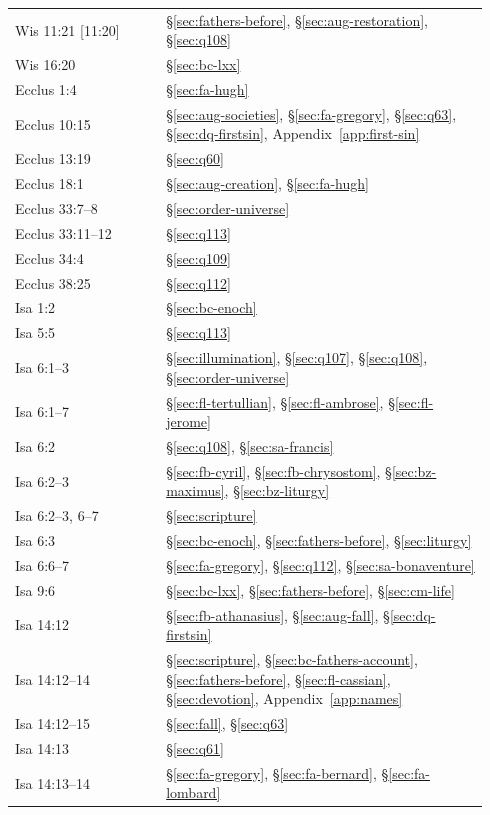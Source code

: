 \begin{longtable}{>{\raggedright\arraybackslash}p{0.30\linewidth}>{\raggedright\arraybackslash}p{0.64\linewidth}}
Wis 11:21 [11:20] & \S\ref{sec:fathers-before}, \S\ref{sec:aug-restoration}, \S\ref{sec:q108}\\
Wis 16:20 & \S\ref{sec:bc-lxx}\\
Ecclus 1:4 & \S\ref{sec:fa-hugh}\\
Ecclus 10:15 & \S\ref{sec:aug-societies}, \S\ref{sec:fa-gregory}, \S\ref{sec:q63}, \S\ref{sec:dq-firstsin}, Appendix~\ref{app:first-sin}\\
Ecclus 13:19 & \S\ref{sec:q60}\\
Ecclus 18:1 & \S\ref{sec:aug-creation}, \S\ref{sec:fa-hugh}\\
Ecclus 33:7--8 & \S\ref{sec:order-universe}\\
Ecclus 33:11--12 & \S\ref{sec:q113}\\
Ecclus 34:4 & \S\ref{sec:q109}\\
Ecclus 38:25 & \S\ref{sec:q112}\\
Isa 1:2 & \S\ref{sec:bc-enoch}\\
Isa 5:5 & \S\ref{sec:q113}\\
Isa 6:1--3 & \S\ref{sec:illumination}, \S\ref{sec:q107}, \S\ref{sec:q108}, \S\ref{sec:order-universe}\\
Isa 6:1--7 & \S\ref{sec:fl-tertullian}, \S\ref{sec:fl-ambrose}, \S\ref{sec:fl-jerome}\\
Isa 6:2 & \S\ref{sec:q108}, \S\ref{sec:sa-francis}\\
Isa 6:2--3 & \S\ref{sec:fb-cyril}, \S\ref{sec:fb-chrysostom}, \S\ref{sec:bz-maximus}, \S\ref{sec:bz-liturgy}\\
Isa 6:2--3, 6--7 & \S\ref{sec:scripture}\\
Isa 6:3 & \S\ref{sec:bc-enoch}, \S\ref{sec:fathers-before}, \S\ref{sec:liturgy}\\
Isa 6:6--7 & \S\ref{sec:fa-gregory}, \S\ref{sec:q112}, \S\ref{sec:sa-bonaventure}\\
Isa 9:6 & \S\ref{sec:bc-lxx}, \S\ref{sec:fathers-before}, \S\ref{sec:cm-life}\\
Isa 14:12 & \S\ref{sec:fb-athanasius}, \S\ref{sec:aug-fall}, \S\ref{sec:dq-firstsin}\\
Isa 14:12--14 & \S\ref{sec:scripture}, \S\ref{sec:bc-fathers-account}, \S\ref{sec:fathers-before}, \S\ref{sec:fl-cassian}, \S\ref{sec:devotion}, Appendix~\ref{app:names}\\
Isa 14:12--15 & \S\ref{sec:fall}, \S\ref{sec:q63}\\
Isa 14:13 & \S\ref{sec:q61}\\
Isa 14:13--14 & \S\ref{sec:fa-gregory}, \S\ref{sec:fa-bernard}, \S\ref{sec:fa-lombard}\\

\end{longtable}
